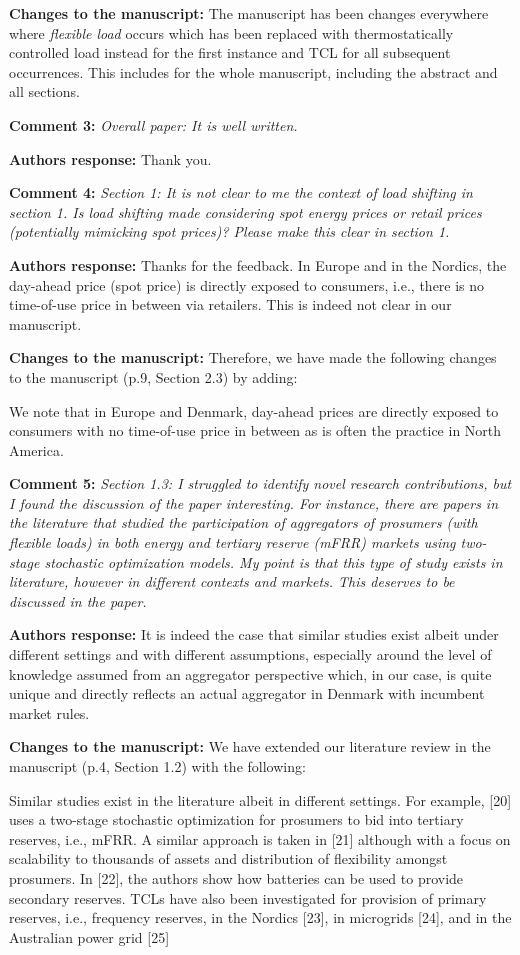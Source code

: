 \documentclass[10pt]{article}
\newcounter{models}
\newcommand{\nt}[1]{\textcolor{newtextcolor}{#1}}
\newcommand{\auth}{\textbf{Authors response: }}
\newcommand{\changes}{\textbf{Changes to the manuscript: }}
\begin{document}
\changes The manuscript has been changes everywhere where \textit{flexible load} occurs which has been replaced with \nt{thermostatically controlled load} instead for the first instance and \nt{TCL} for all subsequent occurrences. This includes for the whole manuscript, including the abstract and all sections.

\textbf{Comment 3:} \textit{Overall paper: It is well written.}

\auth Thank you.

\textbf{Comment 4:} \textit{Section 1: It is not clear to me the context of load shifting in section 1. Is load shifting made considering spot energy prices or retail prices (potentially mimicking spot prices)? Please make this clear in section 1.}

\auth Thanks for the feedback. In Europe and in the Nordics, the day-ahead price (spot price) is directly exposed to consumers, i.e., there is no time-of-use price in between via retailers. This is indeed not clear in our manuscript.

\changes Therefore, we have made the following changes to the manuscript (p.9, Section 2.3) by adding:

\nt{We note that in Europe and Denmark, day-ahead prices are directly exposed to consumers with no time-of-use price in between as is often the practice in North America.}

\textbf{Comment 5:} \textit{Section 1.3: I struggled to identify novel research contributions, but I found the discussion of the paper interesting. For instance, there are papers in the literature that studied the participation of aggregators of prosumers (with flexible loads) in both energy and tertiary reserve (mFRR) markets using two-stage stochastic optimization models. My point is that this type of study exists in literature, however in different contexts and markets. This deserves to be discussed in the paper.}

\auth It is indeed the case that similar studies exist albeit under different settings and with different assumptions, especially around the level of knowledge assumed from an aggregator perspective which, in our case, is quite unique and directly reflects an actual aggregator in Denmark with incumbent market rules.

\changes We have extended our literature review in the manuscript (p.4, Section 1.2) with the following:

\nt{Similar studies exist in the literature albeit in different settings. For example, [20] uses a two-stage stochastic optimization for prosumers to bid into tertiary reserves, i.e., mFRR. A similar approach is taken in [21] although with a focus on scalability to thousands of assets and distribution of flexibility amongst prosumers. In [22], the authors show how batteries can be used to provide secondary reserves. TCLs have also been investigated for provision of primary reserves, i.e., frequency reserves, in the Nordics [23], in microgrids [24], and in the Australian power grid [25]}
\end{document}
